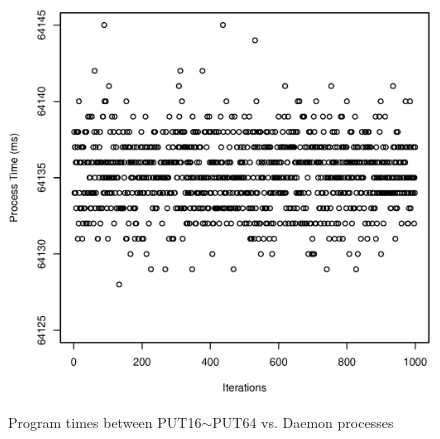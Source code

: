 \documentclass[10pt]{article}
\begin{document}
\begin{figure}[htp!]
{		\includegraphics[scale=0.35]{put64_pt.eps}
		\label{fig:put64_pt}
	}
	\caption{Program times between PUT16$\sim$PUT64 vs. Daemon processes~\label{fig:put_daemon_pt2}}
\end{figure}
\end{document}
